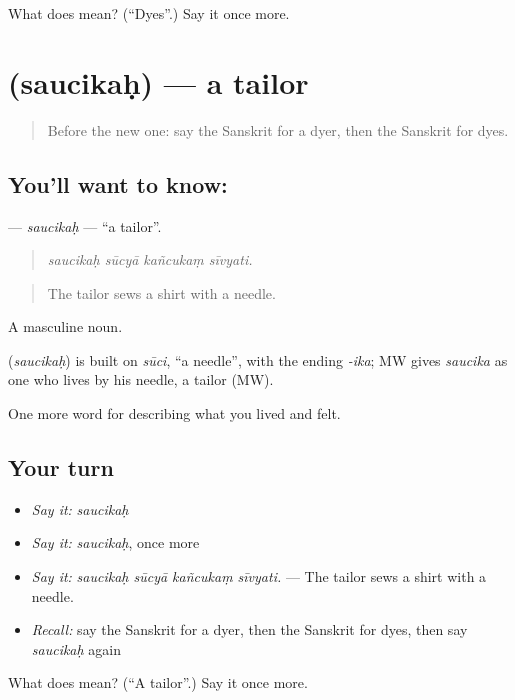\begin{tcolorbox}[breakable,colback=teal!4,colframe=teal!35!black,title={Before you move on}]
What does  mean? (\textquotedblleft{}Dyes\textquotedblright{}.) Say it once more.
\end{tcolorbox}
\section[\texorpdfstring{\sk{सौचिकः} (saucikaḥ)}{सौचिकः (saucikaḥ)}]{ (saucikaḥ) — a tailor}

\label{lesson:SA-C506-saucikah}



\begin{quote}
Before the new one: say the Sanskrit for a dyer, then the Sanskrit for dyes.
\end{quote}

\subsection*{You'll want to know: }
\textbf{} — \emph{saucikaḥ} — \textquotedblleft{}a tailor\textquotedblright{}.

\begin{quote}
   
\end{quote}

\begin{quote}
\emph{saucikaḥ sūcyā kañcukaṃ sīvyati.}
\end{quote}

\begin{quote}
The tailor sews a shirt with a needle.
\end{quote}

A masculine noun.

\begin{cousinweb}
\textbf{} (\emph{saucikaḥ}) is built on \emph{sūci}, \textquotedblleft{}a needle\textquotedblright{}, with the ending \emph{-ika}; MW gives \emph{saucika} as one who lives by his needle, a tailor (MW).
\end{cousinweb}

\begin{grammarlens}[title={What you've built}]
One more word for describing what you lived and felt.
\end{grammarlens}

\subsection*{Your turn}
\begin{itemize}
\raggedright
  \item \emph{Say it:} \emph{saucikaḥ}
  \item \emph{Say it:} \emph{saucikaḥ}, once more
  \item \emph{Say it:} \emph{saucikaḥ sūcyā kañcukaṃ sīvyati.} — The tailor sews a shirt with a needle.
  \item \emph{Recall:} say the Sanskrit for a dyer, then the Sanskrit for dyes, then say \emph{saucikaḥ} again
\end{itemize}

\begin{tcolorbox}[breakable,colback=teal!4,colframe=teal!35!black,title={Before you move on}]
What does  mean? (\textquotedblleft{}A tailor\textquotedblright{}.) Say it once more.
\end{tcolorbox}
